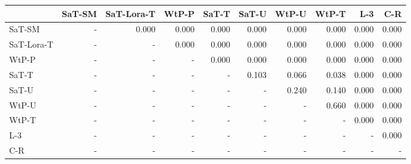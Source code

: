 \begin{tabular}{lrrrrrrrrr}
\toprule
 & SaT-SM & SaT-Lora-T & WtP-P & SaT-T & SaT-U & WtP-U & WtP-T & L-3 & C-R \\
\midrule
SaT-SM & - & 0.000 & 0.000 & 0.000 & 0.000 & 0.000 & 0.000 & 0.000 & 0.000 \\
SaT-Lora-T & - & - & 0.000 & 0.000 & 0.000 & 0.000 & 0.000 & 0.000 & 0.000 \\
WtP-P & - & - & - & 0.000 & 0.000 & 0.000 & 0.000 & 0.000 & 0.000 \\
SaT-T & - & - & - & - & 0.103 & 0.066 & 0.038 & 0.000 & 0.000 \\
SaT-U & - & - & - & - & - & 0.240 & 0.140 & 0.000 & 0.000 \\
WtP-U & - & - & - & - & - & - & 0.660 & 0.000 & 0.000 \\
WtP-T & - & - & - & - & - & - & - & 0.000 & 0.000 \\
L-3 & - & - & - & - & - & - & - & - & 0.000 \\
C-R & - & - & - & - & - & - & - & - & - \\
\bottomrule
\end{tabular}

